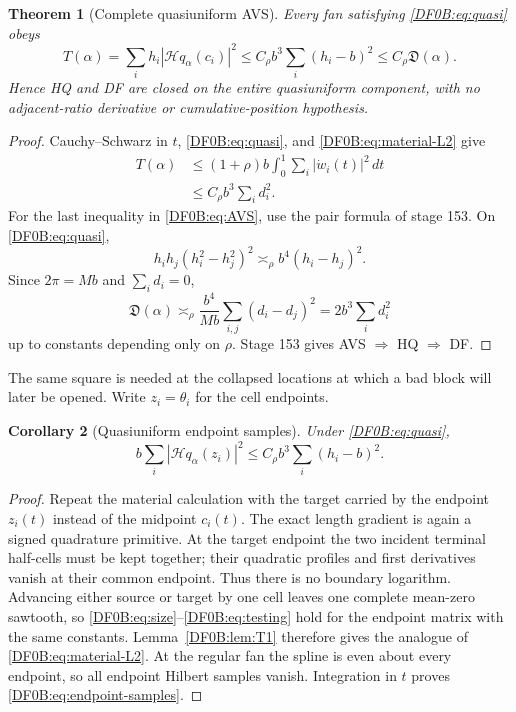 \documentclass[11pt]{amsart}
\numberwithin{equation}{section}
\newtheorem{theorem}{Theorem}[section]
\newtheorem{corollary}[theorem]{Corollary}
\theoremstyle{definition}
\theoremstyle{remark}
\newcommand{\Hil}{\mathcal H}
\newcommand{\Dvar}{\mathfrak D}
\begin{document}
\begin{theorem}[Complete quasiuniform AVS]
\label{DF0B:thm:AVS}
Every fan satisfying \eqref{DF0B:eq:quasi} obeys
\begin{equation}\label{DF0B:eq:AVS}
 \boxed{
 T(\alpha)=\sum_i h_i|\Hil q_\alpha(c_i)|^2
 \le C_\rho b^3\sum_i(h_i-b)^2
 \le C_\rho\Dvar(\alpha).}
\end{equation}
Hence HQ and DF are closed on the entire quasiuniform component, with no
adjacent-ratio derivative or cumulative-position hypothesis.
\end{theorem}

\begin{proof}
Cauchy--Schwarz in $t$, \eqref{DF0B:eq:quasi}, and
\eqref{DF0B:eq:material-L2} give
\begin{align*}
 T(\alpha)
 &\le(1+\rho)b\int_0^1\sum_i|\dot w_i(t)|^2\,dt\\
 &\le C_\rho b^3\sum_i d_i^2.
\end{align*}
For the last inequality in \eqref{DF0B:eq:AVS}, use the pair formula of stage
153.  On \eqref{DF0B:eq:quasi},
\[
 h_ih_j(h_i^2-h_j^2)^2\asymp_\rho
 b^4(h_i-h_j)^2.
\]
Since $2\pi=Mb$ and $\sum_i d_i=0$,
\[
 \Dvar(\alpha)
 \asymp_\rho\frac{b^4}{Mb}
 \sum_{i,j}(d_i-d_j)^2
 =2b^3\sum_i d_i^2
\]
up to constants depending only on $\rho$.  Stage 153 gives
AVS $\Rightarrow$ HQ $\Rightarrow$ DF.
\end{proof}

The same square is needed at the collapsed locations at which a bad
block will later be opened.  Write $z_i=\theta_i$ for the cell endpoints.

\begin{corollary}[Quasiuniform endpoint samples]
\label{DF0B:cor:endpoints}
Under \eqref{DF0B:eq:quasi},
\begin{equation}\label{DF0B:eq:endpoint-samples}
 \boxed{
 b\sum_i|\Hil q_\alpha(z_i)|^2
 \le C_\rho b^3\sum_i(h_i-b)^2.}
\end{equation}
\end{corollary}

\begin{proof}
Repeat the material calculation with the target carried by the endpoint
$z_i(t)$ instead of the midpoint $c_i(t)$.  The exact length gradient is
again a signed quadrature primitive.  At the target endpoint the two
incident terminal half-cells must be kept together; their quadratic
profiles and first derivatives vanish at their common endpoint.  Thus
there is no boundary logarithm.  Advancing either source or target by one
cell leaves one complete mean-zero sawtooth, so
\eqref{DF0B:eq:size}--\eqref{DF0B:eq:testing} hold for the endpoint matrix with the
same constants.  Lemma~\ref{DF0B:lem:T1} therefore gives the analogue of
\eqref{DF0B:eq:material-L2}.  At the regular fan the spline is even about every
endpoint, so all endpoint Hilbert samples vanish.  Integration in $t$
proves \eqref{DF0B:eq:endpoint-samples}.
\end{proof}
\end{document}
